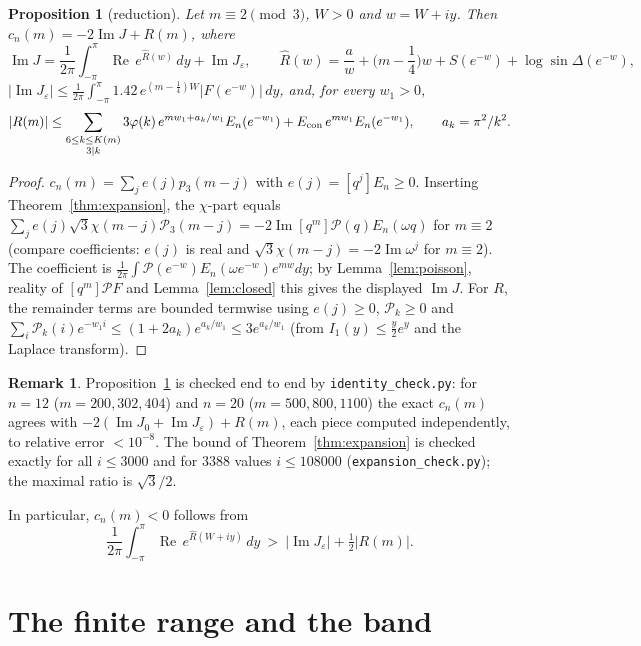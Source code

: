 \documentclass[11pt,reqno]{amsart}
\theoremstyle{plain}
\newtheorem{proposition}[theorem]{Proposition}
\theoremstyle{definition}
\newtheorem{remark}[theorem]{Remark}
\newcommand{\Rh}{\widehat R}
\newcommand{\cP}{\mathcal P}
\renewcommand{\Re}{\operatorname{Re}}
\renewcommand{\Im}{\operatorname{Im}}
\begin{document}
\begin{proposition}[reduction]\label{prop:reduce}
Let $m\equiv2\pmod3$, $W>0$ and $w=W+iy$. Then $c_n(m)=-2\Im J+R(m)$, where
\[
\Im J=\frac1{2\pi}\int_{-\pi}^{\pi}\Re\, e^{\Rh(w)}\,dy+\Im J_\varepsilon,\qquad
\Rh(w)=\frac aw+\Big(m-\frac14\Big)w+S(e^{-w})+\log\sin\Delta(e^{-w}),
\]
$|\Im J_\varepsilon|\le\frac1{2\pi}\int_{-\pi}^{\pi}1.42\,e^{(m-\frac14)W}|F(e^{-w})|\,dy$, and, for every $w_1>0$,
\[
|R(m)|\le\sum_{\substack{6\le k\le K(m)\\3\mid k}}3\varphi(k)\,e^{mw_1+a_k/w_1}E_n(e^{-w_1})+E_{\rm con}\,e^{mw_1}E_n(e^{-w_1}),\qquad a_k=\pi^2/k^2 .
\]
\end{proposition}
\begin{proof}
$c_n(m)=\sum_je(j)p_3(m-j)$ with $e(j)=[q^j]E_n\ge0$. Inserting Theorem~\ref{thm:expansion}, the $\chi$-part equals
$\sum_je(j)\sqrt3\chi(m-j)\cP_3(m-j)=-2\Im[q^m]\cP(q)E_n(\omega q)$ for $m\equiv2$ (compare coefficients: $e(j)$ is real and
$\sqrt3\chi(m-j)=-2\Im\omega^{j}$ for $m\equiv2$). The coefficient is $\frac1{2\pi}\int\cP(e^{-w})E_n(\omega e^{-w})e^{mw}dy$;
by Lemma~\ref{lem:poisson}, reality of $[q^m]\cP F$ and Lemma~\ref{lem:closed} this gives the displayed $\Im J$. For $R$, the
remainder terms are bounded termwise using $e(j)\ge0$, $\cP_k\ge0$ and
$\sum_i\cP_k(i)e^{-w_1i}\le(1+2a_k)e^{a_k/w_1}\le3e^{a_k/w_1}$ (from $I_1(y)\le\frac y2e^y$ and the Laplace transform).
\end{proof}

\begin{remark}
Proposition~\ref{prop:reduce} is checked end to end by \texttt{identity\_check.py}: for $n=12$ ($m=200,302,404$) and $n=20$
($m=500,800,1100$) the exact $c_n(m)$ agrees with $-2(\Im J_0+\Im J_\varepsilon)+R(m)$, each piece computed independently, to
relative error $<10^{-8}$. The bound of Theorem~\ref{thm:expansion} is checked exactly for all $i\le3000$ and for $3388$ values
$i\le108000$ (\texttt{expansion\_check.py}); the maximal ratio is $\sqrt3/2$.
\end{remark}

In particular, $c_n(m)<0$ follows from
\begin{equation}\label{eq:target}
\frac1{2\pi}\int_{-\pi}^{\pi}\Re\,e^{\Rh(W+iy)}\,dy\ >\ |\Im J_\varepsilon|+\tfrac12|R(m)| .
\end{equation}

\section{The finite range and the band}\label{sec:finite}
\end{document}
